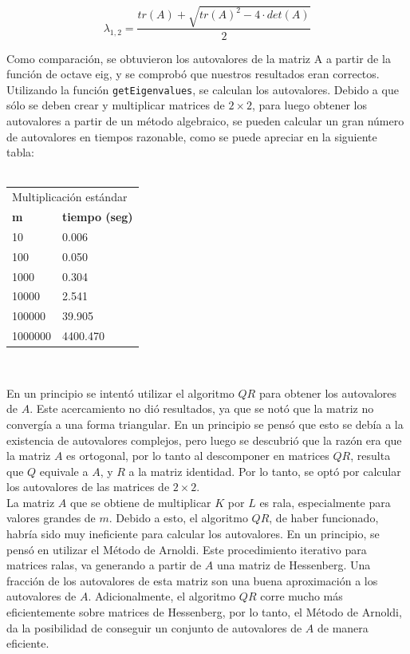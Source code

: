 \documentclass[a4paper,11pt]{article}
\begin{document}
\begin{equation}
    \lambda_{1,2} = \frac{tr(A) + \sqrt{tr(A)^2 - 4 \cdot det(A)}}{2}
\end{equation}

Como comparación, se obtuvieron los autovalores de la matriz A a partir de la función de octave eig,
y se comprobó que nuestros resultados eran correctos.\\

Utilizando la función \verb+getEigenvalues+, se calculan los autovalores. Debido a que
sólo se deben crear y multiplicar matrices de $2 \times 2$, para luego obtener los
autovalores a partir de un método algebraico, se pueden calcular un gran número
de autovalores en tiempos razonable, como se puede apreciar en la siguiente tabla:\\ \\
{\centering
\begin{tabular}{|l||l|}
\hline
\multicolumn{2}{|l|}{Multiplicaci\'on est\'andar}\\
\cline{1-2}
\textbf{m}&\textbf{tiempo (seg)}\\
\hline\hline
10 & 0.006 \\
100 & 0.050\\
1000 & 0.304\\
10000 & 2.541\\
100000 & 39.905\\
1000000 & 4400.470\\
\hline
\end{tabular}\\[10pt]
}

En un principio se intentó utilizar el algoritmo $QR$ para obtener los
autovalores de $A$. Este acercamiento no di\'o resultados, ya que se not\'o que la
matriz no converg\'ia a una forma triangular. En un principio se pens\'o que esto
se deb\'ia a la existencia de autovalores complejos, pero luego se descubri\'o que
la raz\'on era que la matriz $A$ es ortogonal, por lo tanto al descomponer en
matrices $QR$, resulta que $Q$ equivale a $A$, y $R$ a la matriz identidad. Por lo tanto, se opt\'o por
calcular los autovalores de las matrices de $2 \times 2$.\\

La matriz $A$ que se obtiene de multiplicar $K$ por $L$ es rala, especialmente para
valores grandes de $m$. Debido a esto, el algoritmo $QR$, de haber funcionado,
habr\'ia sido muy ineficiente para calcular los autovalores. En un principio, se
pens\'o en utilizar el M\'etodo de Arnoldi. Este procedimiento iterativo para
matrices ralas, va generando a partir de $A$ una matriz de Hessenberg. Una
fracci\'on de los autovalores de esta matriz son una buena aproximaci\'on a los
autovalores de $A$. Adicionalmente, el algoritmo $QR$ corre mucho m\'as
eficientemente sobre matrices de Hessenberg, por lo tanto, el M\'etodo de
Arnoldi, da la posibilidad de conseguir un conjunto de autovalores de $A$ de
manera eficiente. \\
\end{document}
